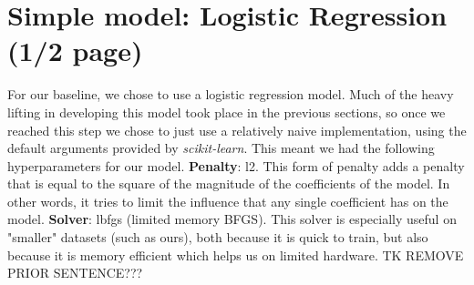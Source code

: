 \section{Simple model: Logistic Regression (1/2 page)} 
For our baseline, we chose to use a logistic regression model. Much of the heavy lifting in developing this model took place in the previous sections,
so once we reached this step we chose to just use a relatively naive implementation, using the default arguments provided
by \textit{scikit-learn}. This meant we had the following hyperparameters for our model. \textbf{Penalty}: l2. This form of penalty adds a penalty that is equal to the square of the magnitude of the
    coefficients of the model. In other words, it tries to limit the influence that any single coefficient has on the
    model. \textbf{Solver}: lbfgs (limited memory BFGS). This solver is especially useful on "smaller" datasets (such as
    ours), both because it is quick to train, but also because it is memory efficient which helps us on limited
    hardware. TK REMOVE PRIOR SENTENCE???
